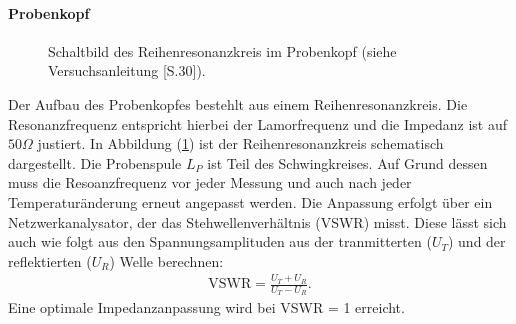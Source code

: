 \paragraph{Probenkopf}
\begin{figure}
	\centering
	\caption{Schaltbild des Reihenresonanzkreis im Probenkopf (siehe Versuchsanleitung \cite{Anleitung}[S.30]).}
	\label{probenkopf.}
\end{figure}
Der Aufbau des Probenkopfes bestehlt aus einem Reihenresonanzkreis.
Die Resonanzfrequenz entspricht hierbei der Lamorfrequenz und die Impedanz ist auf $50 \Omega$ justiert.
In Abbildung (\ref{probenkopf.}) ist der Reihenresonanzkreis schematisch dargestellt.
Die Probenspule $L_P$ ist Teil des Schwingkreises.
Auf Grund dessen muss die Resoanzfrequenz vor jeder Messung und auch nach jeder Temperatur\"{a}nderung erneut angepasst werden.
Die Anpassung erfolgt \"{u}ber ein Netzwerkanalysator, der das Stehwellenverhältnis (VSWR) misst.
Diese l\"{a}sst sich auch wie folgt aus den Spannungsamplituden aus der tranmitterten ($U_T$) und der reflektierten ($U_R$) Welle berechnen:
\begin{align*}
	\text{VSWR} = \frac{U_T + U_R}{U_T - U_R} .
\end{align*}
Eine optimale Impedanzanpassung wird bei VSWR = 1 erreicht.

